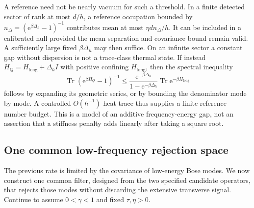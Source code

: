 \documentclass[aps,pra,reprint,superscriptaddress,longbibliography]{revtex4-2}
\newcommand{\Tr}{\operatorname{Tr}}
\newcommand{\ee}{\mathrm e}
\begin{document}
A reference need not be nearly vacuum for such a threshold.  In a
finite detected sector of rank at most $d/h$, a reference occupation
bounded by $n_\Delta=(\ee^{\beta\Delta_h}-1)^{-1}$ contributes mean
at most $\eta d n_\Delta/h$.  It can be included in a calibrated null
provided the mean separation and covariance bound remain valid.  A
sufficiently large fixed $\beta\Delta_h$ may then suffice.  On an
infinite sector a constant gap without dispersion is not a trace-class
thermal state.  If instead $H_Q=H_{\mathrm{long}}+\Delta_h I$ with
positive confining $H_{\mathrm{long}}$, then the spectral inequality
\begin{equation}
 \Tr(\ee^{\beta H_Q}-1)^{-1}
  \le\frac{\ee^{-\beta\Delta_h}}{1-\ee^{-\beta\Delta_h}}
                         \Tr\ee^{-\beta H_{\mathrm{long}}}
 \label{sgt:bose:dispersive-reference}
\end{equation}
follows by expanding its geometric series, or by bounding the
denominator mode by mode.  A controlled $O(h^{-1})$ heat trace thus
supplies a finite reference number budget.  This is a model of an
additive frequency-energy gap, not an assertion that a stiffness
penalty adds linearly after taking a square root.

\subsection{One common low-frequency rejection space}
\label{sgt:bose:filter}

The previous rate is limited by the covariance of low-energy Bose
modes.  We now construct one common filter, designed from the two
specified candidate operators, that rejects those modes without
discarding the extensive transverse signal.  Continue to assume
$0<\gamma<1$ and fixed $\tau,\eta>0$.
\end{document}
